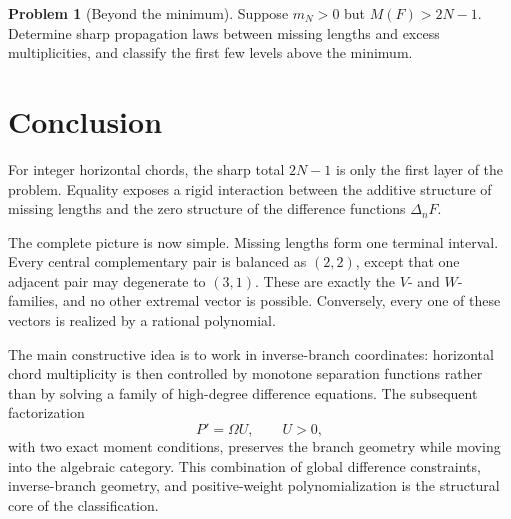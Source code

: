 \documentclass[11pt]{article}
\theoremstyle{definition}
\newtheorem{problem}[theorem]{Problem}
\theoremstyle{remark}
\begin{document}
\begin{problem}[Beyond the minimum]
Suppose \(m_N>0\) but \(M(F)>2N-1\).  Determine sharp propagation laws
between missing lengths and excess multiplicities, and classify the first
few levels above the minimum.
\end{problem}

\section{Conclusion}

For integer horizontal chords, the sharp total \(2N-1\) is only the first
layer of the problem.  Equality exposes a rigid interaction between the
additive structure of missing lengths and the zero structure of the
difference functions \(\Delta_nF\).

The complete picture is now simple.  Missing lengths form one terminal
interval.  Every central complementary pair is balanced as \((2,2)\),
except that one adjacent pair may degenerate to \((3,1)\).  These are
exactly the \(V\)- and \(W\)-families, and no other extremal vector is
possible.  Conversely, every one of these vectors is realized by a
rational polynomial.

The main constructive idea is to work in inverse-branch coordinates:
horizontal chord multiplicity is then controlled by monotone separation
functions rather than by solving a family of high-degree difference
equations.  The subsequent factorization
\[
P'=\Omega U,\qquad U>0,
\]
with two exact moment conditions, preserves the branch geometry while
moving into the algebraic category.  This combination of global
difference constraints, inverse-branch geometry, and positive-weight
polynomialization is the structural core of the classification.
\end{document}

